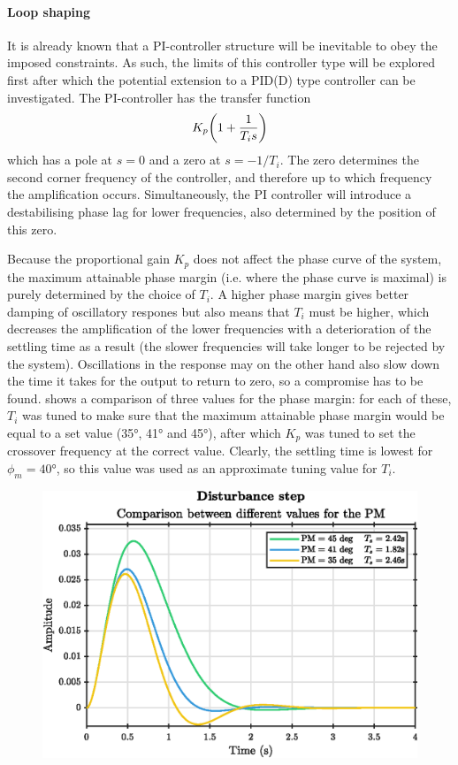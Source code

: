 \paragraph{Loop shaping}
It is already known that a PI-controller structure will be inevitable to obey the imposed constraints. As such, the limits of this controller type will be explored first after which the potential extension to a PID(D) type controller can be investigated. The PI-controller has the transfer function
\begin{equation}
    K_p\qty(1 + \frac{1}{T_is})
\end{equation}
which has a pole at $s = 0$ and a zero at $s = -1/T_i$. The zero determines the second corner frequency of the controller, and therefore up to which frequency the amplification occurs. Simultaneously, the PI controller will introduce a destabilising phase lag for lower frequencies, also determined by the position of this zero.

Because the proportional gain $K_p$ does not affect the phase curve of the system, the maximum attainable phase margin (i.e. where the phase curve is maximal) is purely determined by the choice of $T_i$. A higher phase margin gives better damping of oscillatory respones but also means that $T_i$ must be higher, which decreases the amplification of the lower frequencies with a deterioration of the settling time as a result (the slower frequencies will take longer to be rejected by the system). Oscillations in the response may on the other hand also slow down the time it takes for the output to return to zero, so a compromise has to be found.  shows a comparison of three values for the phase margin: for each of these, $T_i$ was tuned to make sure that the maximum attainable phase margin would be equal to a set value (\ang{35}, \ang{41} and \ang{45}), after which $K_p$ was tuned to set the crossover frequency at the correct value. Clearly, the settling time is lowest for $\phi_m = \ang{40}$, so this value was used as an approximate tuning value for $T_i$. 
\begin{figure}
    \centering
    \includegraphics[]{media/q2/pi_pm_comparison.eps}
    \caption{}
    \label{fig:pm_comparison}
\end{figure}

